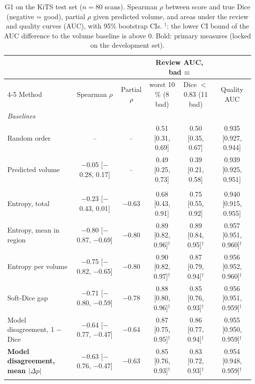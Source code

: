 \begin{table}
\centering\footnotesize
\setlength{\tabcolsep}{4pt}
\caption{G1 on the KiTS test set ($n = 80$ scans). Spearman $\rho$ between score and true Dice (negative = good), partial $\rho$ given predicted volume, and areas under the review and quality curves (AUC), with 95\% bootstrap CIs. $^\dagger$: the lower CI bound of the AUC difference to the volume baseline is above 0. Bold: primary measures (locked on the development set).}
\label{tab:g1}
\begin{tabular}{lccccc}
\toprule
 & & & \multicolumn{2}{c}{Review AUC, bad =} & \\
\cmidrule(lr){4-5}
Method & Spearman $\rho$ & Partial $\rho$ & worst 10 \% (8 bad) & Dice $<$ 0.83 (11 bad) & Quality AUC \\
\midrule
\multicolumn{6}{l}{\emph{Baselines}} \\
\quad Random order & -- & -- & 0.51 [0.31, 0.69] & 0.50 [0.35, 0.67] & 0.935 [0.927, 0.944] \\
\quad Predicted volume & $-$0.05 [$-$0.28, 0.17] & -- & 0.49 [0.25, 0.73] & 0.39 [0.21, 0.58] & 0.939 [0.925, 0.951] \\
\addlinespace
\multicolumn{6}{l}{\emph{GT-free uncertainty measures}} \\
\quad Entropy, total & $-$0.23 [$-$0.43, 0.01] & $-$0.63 & 0.68 [0.43, 0.91] & 0.75 [0.55, 0.92] & 0.940 [0.915, 0.955] \\
\quad Entropy, mean in region & $-$0.80 [$-$0.87, $-$0.69] & $-$0.80 & 0.89 [0.82, 0.96]$^\dagger$ & 0.89 [0.84, 0.95]$^\dagger$ & 0.957 [0.951, 0.960]$^\dagger$ \\
\quad Entropy per volume & $-$0.75 [$-$0.82, $-$0.65] & $-$0.80 & 0.90 [0.82, 0.97]$^\dagger$ & 0.87 [0.79, 0.94]$^\dagger$ & 0.956 [0.952, 0.960]$^\dagger$ \\
\quad Soft-Dice gap & $-$0.71 [$-$0.80, $-$0.59] & $-$0.78 & 0.88 [0.80, 0.96]$^\dagger$ & 0.85 [0.76, 0.93]$^\dagger$ & 0.956 [0.951, 0.959]$^\dagger$ \\
\quad Model disagreement, 1 $-$ Dice & $-$0.64 [$-$0.77, $-$0.47] & $-$0.64 & 0.87 [0.75, 0.95]$^\dagger$ & 0.86 [0.77, 0.94]$^\dagger$ & 0.955 [0.950, 0.959]$^\dagger$ \\
\quad \textbf{Model disagreement, mean $|\Delta p|$} & $-$0.63 [$-$0.76, $-$0.47] & $-$0.63 & 0.85 [0.76, 0.93]$^\dagger$ & 0.83 [0.72, 0.93]$^\dagger$ & 0.954 [0.948, 0.959]$^\dagger$ \\
\addlinespace
\multicolumn{6}{l}{\emph{Plausibility}} \\

\end{tabular}
\end{table}
